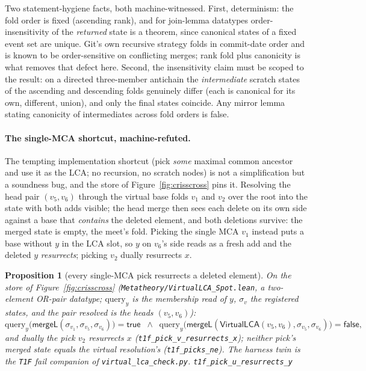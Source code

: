 \documentclass[11pt]{article}
\newtheorem{proposition}[theorem]{Proposition}
\newcommand{\mergeL}{\mathsf{mergeL}}
\newcommand{\lean}[1]{\texttt{#1}}
\newcommand{\code}[1]{\texttt{#1}}
\begin{document}
Two statement-hygiene facts, both machine-witnessed. First,
determinism: the fold order is fixed (ascending rank), and for
join-lemma datatypes order-insensitivity of the \emph{returned} state
is a theorem, since canonical states of a fixed event set are unique.
Git's own recursive strategy folds in commit-date order and is known to
be order-sensitive on conflicting merges; rank fold plus canonicity is
what removes that defect here. Second, the insensitivity claim must be
scoped to the result: on a directed three-member antichain the
\emph{intermediate} scratch states of the ascending and descending
folds genuinely differ (each is canonical for its own, different,
union), and only the final states coincide. Any mirror lemma stating
canonicity of intermediates across fold orders is false.

\paragraph{The single-MCA shortcut, machine-refuted.} The tempting
implementation shortcut (pick \emph{some} maximal common ancestor and
use it as the LCA; no recursion, no scratch nodes) is not a
simplification but a soundness bug, and the store of
Figure~\ref{fig:crisscross} pins it. Resolving the head pair
$(v_5, v_6)$ through the virtual base folds $v_1$ and $v_2$ over the
root into the state with both adds visible; the head merge then sees
each delete on its own side against a base that \emph{contains} the
deleted element, and both deletions survive: the merged state is empty,
the meet's fold. Picking the single MCA $v_1$ instead puts a base
without $y$ in the LCA slot, so $y$ on $v_6$'s side reads as a fresh
add and the deleted $y$ \emph{resurrects}; picking $v_2$ dually
resurrects $x$.

\begin{proposition}[every single-MCA pick resurrects a deleted element]
\label{prop:singlemca}
On the store of Figure~\ref{fig:crisscross}
(\lean{Metatheory/VirtualLCA\_Spot.lean}, a two-element OR-pair
datatype; $\mathrm{query}_y$ is the membership read of $y$, $\sigma_v$
the registered states, and the pair resolved is the heads
$(v_5, v_6)$):
\[
  \mathrm{query}_y\bigl(\mergeL(\sigma_{v_1}, \sigma_{v_5},
  \sigma_{v_6})\bigr) = \mathsf{true}
  \;\;\wedge\;\;
  \mathrm{query}_y\bigl(\mergeL(\mathsf{VirtualLCA}(v_5, v_6),
  \sigma_{v_5}, \sigma_{v_6})\bigr) = \mathsf{false} ,
\]
and dually the pick $v_2$ resurrects $x$
(\lean{t1f\_pick\_v\_resurrects\_x}); neither pick's merged state equals
the virtual resolution's (\lean{t1f\_picks\_ne}). The harness twin is
the \code{T1F} fail companion of \code{virtual\_lca\_check.py}.
\hfill\lean{t1f\_pick\_u\_resurrects\_y}
\end{proposition}
\end{document}
